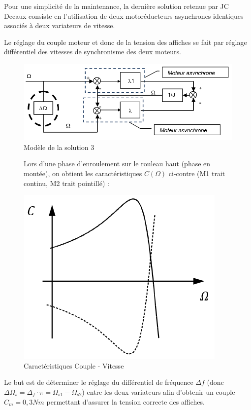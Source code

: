 Pour une simplicité de la maintenance, la dernière solution retenue par JC Decaux consiste en l'utilisation de deux motoréducteurs asynchrones identiques associés à deux variateurs de vitesse.

Le réglage du couple moteur et donc de la tension des affiches se fait par réglage différentiel des vitesses de synchronisme des deux moteurs.

\begin{figure}[!h]
\begin{center}
	\includegraphics[width=0.6\linewidth]{img/fig19}
\end{center}
	\caption{Modèle de la solution 3}
	\label{fig19}
\end{figure}

\begin{figure}[!h]
\begin{minipage}{0.5\linewidth}
Lors d'une phase d'enroulement sur le rouleau haut (phase en montée), on obtient les caractéristiques $C(\Omega)$ ci-contre (M1 trait continu, M2 trait pointillé) :
\end{minipage}\hfill
\begin{minipage}{0.45\linewidth}
\begin{center}
	\includegraphics[width=0.45\linewidth]{img/fig20}
\end{center}
\end{minipage}
\caption{Caractéristiques Couple - Vitesse}
\label{fig20}
\end{figure}

Le but est de déterminer le réglage du différentiel de fréquence $\Delta f$ (donc $\Delta\Omega_s=\Delta_f\cdot \pi=\Omega_{s1}-\Omega_{s2}$) entre les deux variateurs afin d'obtenir un couple $C_m=0,3Nm$ permettant d'assurer la tension correcte des affiches.

